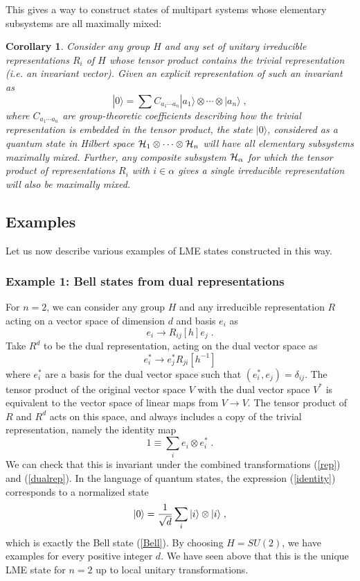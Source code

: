 \documentclass[12pt]{article}
\newtheorem{corollary}[theorem]{Corollary}
\theoremstyle{definition}
\newcommand{\be}{\begin{equation}}
\newcommand{\ee}{\end{equation}}
\begin{document}
This gives a way to construct states of multipart systems whose elementary subsystems are all maximally mixed:
\begin{corollary}
Consider any group $H$ and any set of unitary irreducible representations $R_i$ of $H$ whose tensor product contains the trivial representation (i.e. an invariant vector). Given an explicit representation of such an invariant as
\be
\label{genstates}
|0 \rangle = \sum C_{a_1 \cdots a_n} |a_1 \rangle \otimes \cdots \otimes | a_n \rangle \; ,
\ee
where $C_{a_1 \cdots a_n}$ are group-theoretic coefficients describing how the trivial representation is embedded in the tensor product, the state $|0 \rangle$, considered as a quantum state in Hilbert space ${\cal H}_1 \otimes \cdots \otimes {\cal H}_n $ will have all elementary subsystems maximally mixed. Further, any composite subsystem ${\cal H}_{\alpha}$ for which the tensor product of representations $R_i$ with $i \in \alpha$ gives a single irreducible representation will also be maximally mixed.
\end{corollary}

\subsection{Examples}

Let us now describe various examples of LME states constructed in this way.

\subsubsection*{Example 1:  Bell states from dual representations}

For $n=2$, we can consider any group $H$ and any irreducible representation $R$ acting on a vector space of dimension $d$ and basis $e_i$ as
\be
\label{rep}
e_i \to R_{ij}[h] e_j \; .
\ee
Take $R^d$ to be the dual representation, acting on the dual vector space as
\be
\label{dualrep}
e^*_i \to  e^*_j R_{ji}[h^{-1}]
\ee
where $e^*_i$ are a basis for the dual vector space such that $(e^*_i, e_j) = \delta_{ij}$. The tensor product of the original vector space $V$ with the dual vector space $V^*$ is equivalent to the vector space of linear maps from $V \to V$. The tensor product of $R$ and $R^d$ acts on this space, and always includes a copy of the trivial representation, namely the identity map
\be
\label{identity}
1 \equiv \sum_i e_i \otimes e_i^* \; .
\ee
We can check that this is invariant under the combined transformations (\ref{rep}) and (\ref{dualrep}). In the language of quantum states, the expression (\ref{identity}) corresponds to a normalized state
\be
|0 \rangle = {1 \over \sqrt{d}} \sum_i |i \rangle \otimes |i \rangle \; ,
\ee
which is exactly the Bell state (\ref{Bell}). By choosing $H = SU(2)$, we have examples for every positive integer $d$. We have seen above that this is the unique LME state for $n=2$ up to local unitary transformations.
\end{document}
